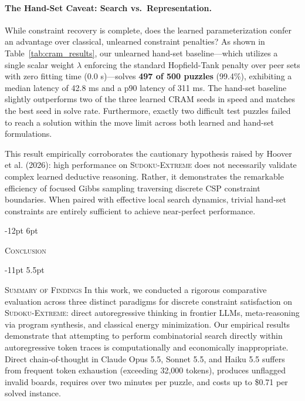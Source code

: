 \documentclass{article} %
\makeatletter
\renewcommand\section{\@startsection{section}{1}{\z@}%
  {-12pt \@plus -3pt \@minus -2pt}%
  {6pt \@plus 2pt}%
  {\normalfont\fontsize{12}{14}\selectfont\scshape\raggedright}}
\renewcommand\subsection{\@startsection{subsection}{2}{\z@}%
  {-11pt \@plus -3pt \@minus -2pt}%
  {5.5pt \@plus 2pt}%
  {\normalfont\fontsize{10}{12}\selectfont\scshape\raggedright}}
\makeatother
\begin{document}
\paragraph{The Hand-Set Caveat: Search vs.\ Representation.} While constraint recovery is complete, does the learned parameterization confer an advantage over classical, unlearned constraint penalties? As shown in Table~\ref{tab:cram_results}, our unlearned hand-set baseline---which utilizes a single scalar weight $\lambda$ enforcing the standard Hopfield-Tank penalty over peer sets with zero fitting time ($0.0$ s)---solves \textbf{497 of 500 puzzles} (99.4\%), exhibiting a median latency of 42.8 ms and a p90 latency of 311 ms. The hand-set baseline slightly outperforms two of the three learned CRAM seeds in speed and matches the best seed in solve rate. Furthermore, exactly two difficult test puzzles failed to reach a solution within the move limit across both learned and hand-set formulations. 

This result empirically corroborates the cautionary hypothesis raised by Hoover et al. (2026): high performance on \textsc{Sudoku-Extreme} does not necessarily validate complex learned deductive reasoning. Rather, it demonstrates the remarkable efficiency of focused Gibbs sampling traversing discrete CSP constraint boundaries. When paired with effective local search dynamics, trivial hand-set constraints are entirely sufficient to achieve near-perfect performance.

\section{\textsc{Conclusion}}
\label{sec:conclusion}

\subsection{\textsc{Summary of Findings}}
In this work, we conducted a rigorous comparative evaluation across three distinct paradigms for discrete constraint satisfaction on \textsc{Sudoku-Extreme}: direct autoregressive thinking in frontier LLMs, meta-reasoning via program synthesis, and classical energy minimization. Our empirical results demonstrate that attempting to perform combinatorial search directly within autoregressive token traces is computationally and economically inappropriate. Direct chain-of-thought in Claude Opus 5.5, Sonnet 5.5, and Haiku 5.5 suffers from frequent token exhaustion (exceeding 32,000 tokens), produces unflagged invalid boards, requires over two minutes per puzzle, and costs up to \$0.71 per solved instance.
\end{document}

